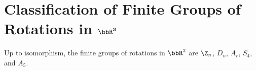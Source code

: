 \section{Classification of Finite Groups of Rotations in $\mathbf{\bbR^3}$}

\begin{theorem}
	Up to isomorphism, the finite groups of rotations in $\bbR^3$ are $\Z_n$, $D_n$, $A_r$, $S_4$, and $A_5$.
\end{theorem}

